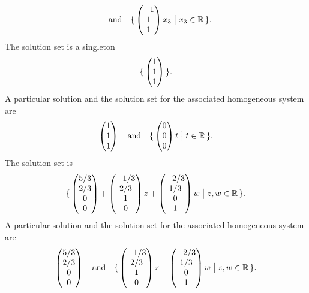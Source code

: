 \begin{exercises}
\begin{answer}
\begin{exparts}
\begin{equation*}
              \quad\text{and}\quad
            \mbox{$\{\,\begin{pmatrix} -1 \\ 1 \\ 1 \end{pmatrix}x_3
              \bigm| x_3\in\mathbb{R}\,\}$}.
          \end{equation*}
        \partsitem
          The solution set is a singleton
          \begin{equation*}
            \mbox{$\{\,\begin{pmatrix} 1 \\ 1 \\ 1 \end{pmatrix}\,\}$}.
          \end{equation*}
          A particular solution and the solution set for the associated
          homogeneous system are
          \begin{equation*}
            \begin{pmatrix} 1 \\ 1 \\ 1 \end{pmatrix}
              \quad\text{and}\quad
            \mbox{$\{\,\begin{pmatrix} 0 \\ 0 \\ 0 \end{pmatrix}t
              \bigm| t\in\mathbb{R}\,\}$}.
          \end{equation*}
        \partsitem
          The solution set is
          \begin{equation*}
            \mbox{$\{\,\begin{pmatrix} 5/3 \\ 2/3 \\ 0 \\ 0 \end{pmatrix}
                 +\begin{pmatrix} -1/3 \\ 2/3 \\ 1 \\ 0 \end{pmatrix}z
                 +\begin{pmatrix} -2/3 \\ 1/3 \\ 0 \\ 1 \end{pmatrix}w
                 \bigm| z,w\in\mathbb{R}\,\}$}.
          \end{equation*}
          A particular solution and the solution set for the associated
          homogeneous system are
          \begin{equation*}
            \begin{pmatrix} 5/3 \\ 2/3 \\ 0 \\ 0 \end{pmatrix}
              \quad\text{and}\quad
            \mbox{$\{\,\begin{pmatrix} -1/3 \\ 2/3 \\ 1 \\ 0 \end{pmatrix}z
                 +\begin{pmatrix} -2/3 \\ 1/3 \\ 0 \\ 1 \end{pmatrix}w
                 \bigm| z,w\in\mathbb{R}\,\}$}.
          \end{equation*}

\end{exparts}
\end{answer}
\end{exercises}
